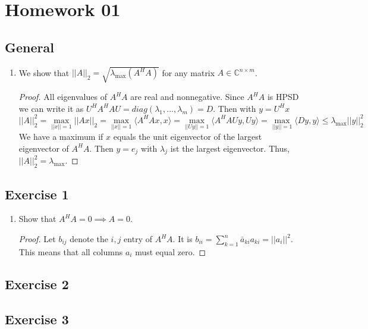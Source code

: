 \documentclass[a4paper, landscape,twocolumn,fontsize=9pt]{scrartcl}
\begin{document}
\section*{Homework 01}

\subsection*{General}
\begin{enumerate}
	\item We show that $||A||_2 = \sqrt{\lambda_{\mathrm{max}}(A^HA)}$ for any matrix $A \in \mathbb C^{n \times m}$.
	\begin{proof}
		All eigenvalues of $A^HA$ are real and nonnegative. Since $A^HA$ is HPSD we can write it as $U^HA^HAU = diag(\lambda_1,...,\lambda_m) = D$. Then with $y = U^Hx$
		\[
			||A||_2^2 = \max_{||x|| = 1} ||Ax||_2 = \max_{||x|| = 1} \langle A^HAx,x \rangle = \max_{||Uy|| = 1} \langle A^HAUy, Uy \rangle = \max_{||y|| = 1} \langle Dy,y \rangle \leq \lambda_{\mathrm{max}}||y||^2_2
		\]
		We have a maximum if $x$ equals the unit eigenvector of the largest eigenvector of $A^HA$. Then $y = e_j$ with $\lambda_j$ ist the largest eigenvector. Thus, $||A||^2_2 = \lambda_{\mathrm{max}}$.
	\end{proof}
\end{enumerate}

\subsection*{Exercise 1}
\begin{enumerate}
	\item Show that $A^HA = 0 \implies A = 0$. \begin{proof}
		Let $b_{ij}$ denote the $i,j$ entry of $A^HA$. It is $b_{ii} = \sum_{k=1}^n \bar a_{ki}a_{ki} = ||a_i||^2$. This means that all columns $a_i$ must equal zero.
	\end{proof}
\end{enumerate}

\subsection*{Exercise 2}

\subsection*{Exercise 3}
\end{document}
